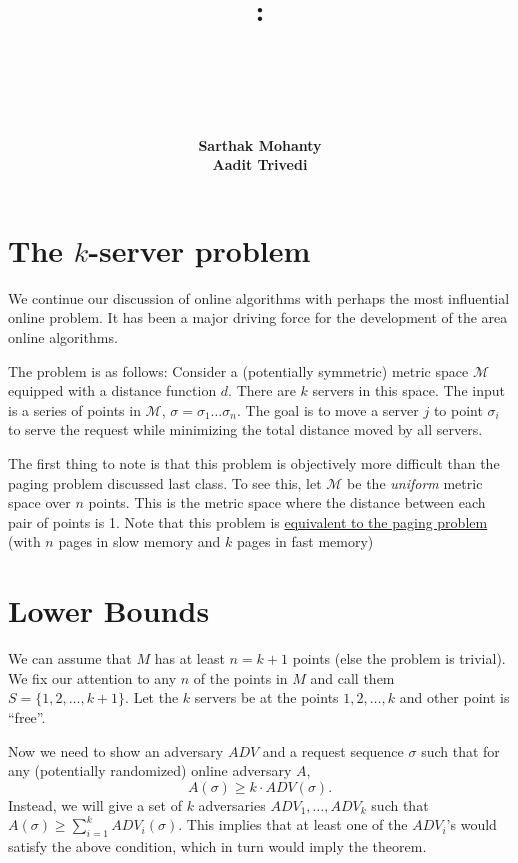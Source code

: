 \documentclass[14pt]{extreport}
\title{
    \vspace{1.75in}
    \textbf{\lectClass:\\ \lectTitle}\\
    \vspace{0.1in}\large{\textit{\lectClassInstructor\ \lectSection}}
    \vspace{2in}
\author{\textbf{Sarthak Mohanty} \\ \textbf{Aadit Trivedi}}
    \date{}
}
\begin{document}
\maketitle
\pagebreak

\section*{The $k$-server problem}
    We continue our discussion of online algorithms with perhaps the most influential online problem. It has been a major driving force for the development of the area online algorithms. 

    \vspace{3mm}
    The problem is as follows: Consider a (potentially symmetric) metric space $\mathcal{M}$ equipped with a distance function $d$. There are $k$ servers in this space. The input is a series of points in $\mathcal{M}$, $\sigma = \sigma_{1}\dots \sigma_{n}$. The goal is to move a server $j$ to point $\sigma_{i}$ to serve the request while minimizing the total distance moved by all servers.

    \vspace{3mm}
    The first thing to note is that this problem is objectively more difficult than the paging problem discussed last class. To see this, let $\mathcal{M}$ be the \textit{uniform} metric space over $n$ points. This is the metric space where the distance between each pair of points is 1. Note that this problem is \underline{equivalent to the paging problem} (with $n$ pages in slow memory and $k$ pages in fast memory)

\section*{Lower Bounds}
    We can assume that \(M\) has at least \(n = k + 1\) points (else the problem is trivial). We fix our attention to any \(n\) of the points in \(M\) and call them \(S = \{1,2,\ldots,k+1\}\). Let the \(k\) servers be at the points \(1,2,\ldots,k\) and other point is ``free''.
    
    \vspace{5mm}
    Now we need to show an adversary \(ADV\) and a request sequence \(\sigma\) such that for any (potentially randomized) online adversary \(A\),
    \[ A(\sigma) \geq k \cdot ADV(\sigma). \]
    Instead, we will give a set of \(k\) adversaries \(ADV_1,\ldots,ADV_k\) such that \(A(\sigma) \geq \sum_{i=1}^{k} ADV_i(\sigma)\). This implies that at least one of the \(ADV_i\)'s would satisfy the above condition, which in turn would imply the theorem.
    
\end{document}
